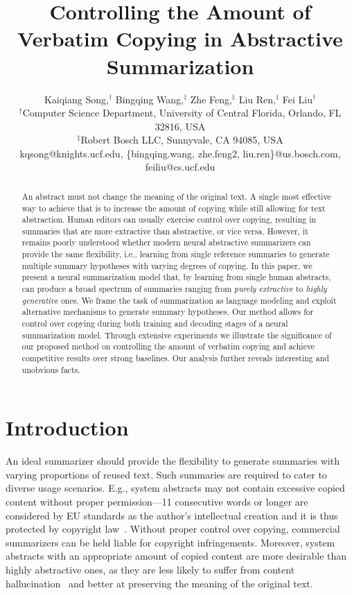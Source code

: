 \documentclass[letterpaper]{article} %
\title{Controlling the Amount of Verbatim Copying in Abstractive Summarization}
\author{
Kaiqiang Song,$^\dagger$
Bingqing Wang,$^\ddagger$
Zhe Feng,$^\ddagger$
Liu Ren,$^\ddagger$ 
Fei Liu$^\dagger$\\
$^\dagger$Computer Science Department, University of Central Florida, Orlando, FL 32816, USA\\
$^\ddagger$Robert Bosch LLC, Sunnyvale, CA 94085, USA\\
kqsong@knights.ucf.edu, \{bingqing.wang, zhe.feng2, liu.ren\}@us.bosch.com, feiliu@cs.ucf.edu\\
}
\begin{document}
\maketitle

\begin{abstract}
An abstract must not change the meaning of the original text.
A single most effective way to achieve that is to increase the amount of copying while still allowing for text abstraction. 
Human editors can usually exercise control over copying, resulting in summaries that are more extractive than abstractive, or vice versa.
However, it remains poorly understood whether modern neural abstractive summarizers can provide the same flexibility, i.e., learning from single reference summaries to generate multiple summary hypotheses with varying degrees of copying.
In this paper, we present a neural summarization model that, by learning from single human abstracts, can produce a broad spectrum of summaries ranging from \emph{purely extractive} to \emph{highly generative} ones.
We frame the task of summarization as language modeling and exploit alternative mechanisms to generate summary hypotheses. 
Our method allows for control over copying during both training and decoding stages of a neural summarization model.
Through extensive experiments we illustrate the significance of our proposed method on controlling the amount of verbatim copying and achieve competitive results over strong baselines.
Our analysis further reveals interesting and unobvious facts.
\end{abstract}

\section{Introduction}
\label{sec:intro}

An ideal summarizer should provide the flexibility to generate summaries with varying proportions of reused text.
Such summaries are required to cater to diverse usage scenarios.
E.g., system abstracts may not contain excessive copied content without proper permission---11 consecutive words or longer are considered by EU standards as the author's intellectual creation and it is thus protected by copyright law~\cite{Castilho:2018}. 
Without proper control over copying, commercial summarizers can be held liable for copyright infringements. 
Moreover, system abstracts with an appropriate amount of copied content are more desirable than highly abstractive ones, as they are less likely to suffer from content hallucination~\cite{Reiter:2018:CL} and better at preserving the meaning of the original text.
\end{document}
